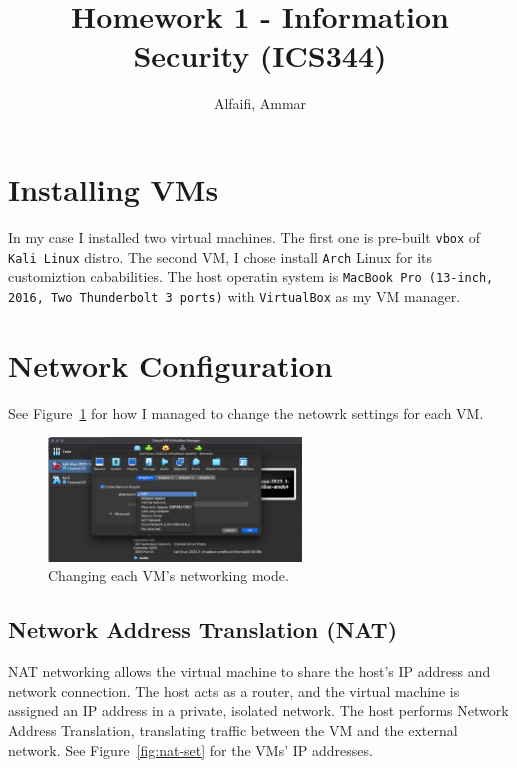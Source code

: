 \documentclass{article}
\title{Homework 1 - Information Security (ICS344)}
\author{Alfaifi, Ammar}
\date{}
\def\c#1{\texttt{#1}}
\begin{document}
\maketitle

\section{Installing VMs}
In my case I installed two virtual machines. The first one is pre-built \c{vbox} of \c{Kali Linux} distro.
The second VM, I chose install \c{Arch} Linux for its customiztion cababilities. The host operatin system is
\c{MacBook Pro (13-inch, 2016, Two Thunderbolt 3 ports)} with \c{VirtualBox} as my VM manager.

\section{Network Configuration}
See Figure~\ref{fig:net-change} for how I managed to change the netowrk settings for each VM.

\begin{figure}[ht]
	\centering
	\includegraphics[width=0.6\textwidth]{figures/setting-network.png}
	\caption{Changing each VM's networking mode.}
	\label{fig:net-change}
\end{figure}

\subsection{Network Address Translation (NAT)}
NAT networking allows the virtual machine to share the host's IP address and network connection. The host acts as a router, and the virtual machine is assigned an IP address in a private, isolated network. The host performs Network Address Translation, translating traffic between the VM and the external network. See Figure~\ref{fig:nat-set} for the VMs' IP addresses.
\end{document}
